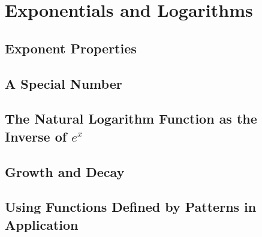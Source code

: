 \documentclass[../precalc.tex]{subfiles}
\begin{document}
\chapter{Exponentials and Logarithms}
\section{Exponent Properties}
\section{A Special Number}
\section{The Natural Logarithm Function as the Inverse of \texorpdfstring{$e^x$}{e to the x}}
\section{Growth and Decay}
\section{Using Functions Defined by Patterns in Application}
\end{document}
